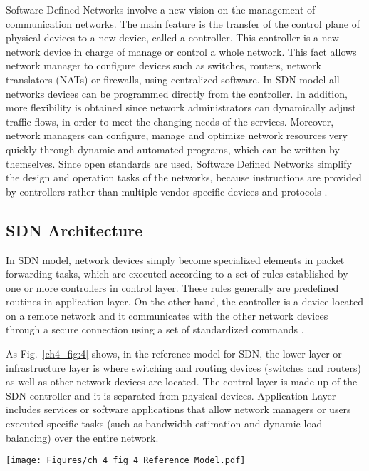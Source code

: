 Software Defined Networks involve a new vision on the management of communication networks. The main feature is the transfer of the control plane of physical devices to a new device, called a controller. This controller is a new network device in charge of manage or control a whole network. This fact allows network manager to configure devices such as switches, routers, network translators (NATs) or firewalls, using centralized software. In SDN model all networks devices can be programmed directly from the controller. In addition, more flexibility is obtained since network administrators can dynamically adjust traffic flows, in order to meet the changing needs of the services. Moreover, network managers can configure, manage and optimize network resources very quickly through dynamic and automated programs, which can be written by themselves. Since open standards are used, Software Defined Networks simplify the design and operation tasks of the networks, because instructions are provided by controllers rather than multiple vendor-specific devices and protocols \cite{onf_2012}.

\subsection{SDN Architecture}
\label{subsec:4.3.1}

In SDN model, network devices simply become specialized elements in packet forwarding tasks, which are executed according to a set of rules established by one or more controllers in control layer. These rules generally are predefined routines in application layer. On the other hand, the controller is a device located on a remote network and it communicates with the other network devices through a secure connection using a set of standardized commands \cite{jarraya_2014,muro_2016,xia_2015}.

As Fig.~\ref{ch4_fig:4} shows, in the reference model for SDN, the lower layer or infrastructure layer is where switching and routing devices (switches and routers) as well as other network devices are located. The control layer is made up of the SDN controller and it is separated from physical devices. Application Layer includes services or software applications that allow network managers or users executed specific tasks (such as bandwidth estimation and dynamic load balancing) over  the entire network.

\begin{center}
\texttt{[image: Figures/ch\_4\_fig\_4\_Reference\_Model.pdf]}
\label{ch4_fig:4}       %
\end{center}

